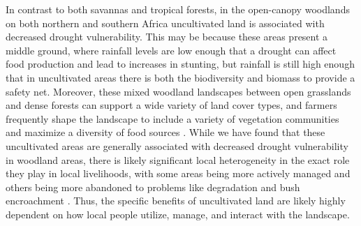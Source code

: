 \documentclass[titlepage]{article}
\begin{document}
In contrast to both savannas and tropical forests, in the open-canopy woodlands on both northern and southern Africa uncultivated land is associated with decreased drought vulnerability.  This may be because these areas present a middle ground, where rainfall levels are low enough that a drought can affect food production and lead to increases in stunting, but rainfall is still high enough that in uncultivated areas there is both the biodiversity and biomass to provide a safety net.  Moreover, these mixed woodland landscapes between open grasslands and dense forests can support a wide variety of land cover types, and farmers frequently shape the landscape to include a variety of vegetation communities and maximize a diversity of food sources \citep{fairhead1996misreading}.  While we have found that these uncultivated areas are generally associated with decreased drought vulnerability in woodland areas, there is likely significant local heterogeneity in the exact role they play in local livelihoods, with some areas being more actively managed and others being more abandoned to problems like degradation and bush encroachment \citep{o2014bush}.  Thus, the specific benefits of uncultivated land are likely highly dependent on how local people utilize, manage, and interact with the landscape.
\end{document}
